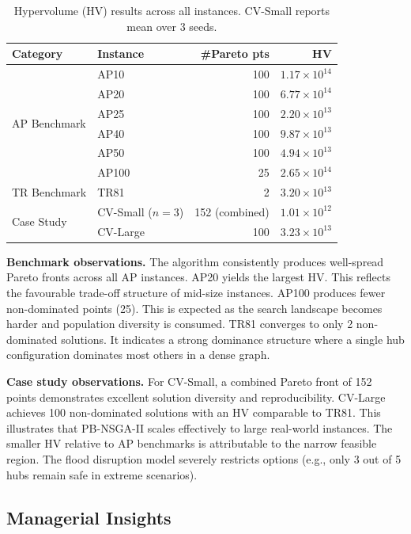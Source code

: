 \documentclass{llncs}
\begin{document}
\begin{table}[ht]
\centering
\caption{Hypervolume (HV) results across all instances. CV-Small reports mean over 3 seeds.}
\label{tab:hv_benchmark}
\begin{tabular}{llrr}
\toprule
Category & Instance & \#Pareto pts & HV \\
\midrule
\multirow{6}{*}{AP Benchmark}
    & AP10  & 100 & $1.17 \times 10^{14}$ \\
    & AP20  & 100 & $6.77 \times 10^{14}$ \\
    & AP25  & 100 & $2.20 \times 10^{13}$ \\
    & AP40  & 100 & $9.87 \times 10^{13}$ \\
    & AP50  & 100 & $4.94 \times 10^{13}$ \\
    & AP100 &  25 & $2.65 \times 10^{14}$ \\
\midrule
TR Benchmark & TR81 & 2 & $3.20 \times 10^{13}$ \\
\midrule
\multirow{2}{*}{Case Study}
    & CV-Small ($n=3$) & 152 (combined) & $1.01 \times 10^{12}$ \\
    & CV-Large         & 100            & $3.23 \times 10^{13}$ \\
\bottomrule
\end{tabular}
\end{table}



\textbf{Benchmark observations.} The algorithm consistently produces well-spread Pareto fronts across all AP instances. AP20 yields the largest HV. This reflects the favourable trade-off structure of mid-size instances. AP100 produces fewer non-dominated points (25). This is expected as the search landscape becomes harder and population diversity is consumed. TR81 converges to only 2 non-dominated solutions. It indicates a strong dominance structure where a single hub configuration dominates most others in a dense graph.

\textbf{Case study observations.} For CV-Small, a combined Pareto front of 152 points demonstrates excellent solution diversity and reproducibility. CV-Large achieves 100 non-dominated solutions with an HV comparable to TR81. This illustrates that PB-NSGA-II scales effectively to large real-world instances. The smaller HV relative to AP benchmarks is attributable to the narrow feasible region. The flood disruption model severely restricts options (e.g., only 3 out of 5 hubs remain safe in extreme scenarios).

\subsection{Managerial Insights}
\end{document}
